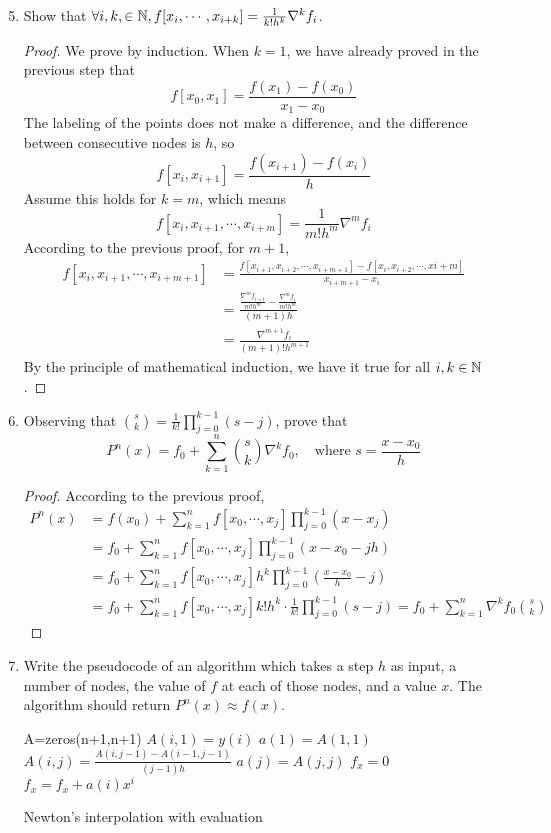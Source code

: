 \begin{enumerate}
	\setcounter{enumi}{4}
	\item Show that \(\forall i,k,\in\mathbb{N}, f[x_i,\cdots,x_{i+k}]=\frac{1}{k!h^k}\nabla^{k}f_i\).
	\begin{proof}
	We prove by induction.
	When $k=1$, we have already proved in the previous step that
	\[ f[x_0,x_{1}]=\frac{f(x_{1})-f(x_0)}{x_1-x_0} \]
	The labeling of the points does not make a difference, and the difference between consecutive nodes is $h$, so
	\[ f[x_i,x_{i+1}]=\frac{f(x_{i+1})-f(x_i)}{h} \]
	Assume this holds for \(k=m\), which means
	\[ f[x_i,x_{i+1},\cdots,x_{i+m}]=\frac{1}{m!h^m}\nabla^mf_i \]
	According to the previous proof, for $m+1$,
	\begin{align*}
	f[x_i,x_{i+1},\cdots,x_{i+m+1}]&=\frac{f[x_{i+1},x_{i+2},\cdots,x_{i+m+1}]-f[x_{i},x_{i+2},\cdots,x{i+m}]}{x_{i+m+1}-x_{i}}\\
	&=\frac{\frac{\nabla^mf_{i+1}}{m!h^m}-\frac{\nabla^mf_{i}}{m!h^m}}{(m+1)h}\\
	&=\frac{\nabla^{m+1}f_i}{(m+1)!h^{m+1}}
	\end{align*}
	By the principle of mathematical induction, we have it true for all \(i,k\in\mathbb{N}\).
	\end{proof}
	\item Observing that \(\binom{s}{k}=\frac{1}{k!}\prod_{j=0}^{k-1}(s-j)\), prove that 
	\[ P^n(x)=f_0 + \sum_{k=1}^{n}\binom{s}{k}\nabla^{k} f_0, \quad \textrm{where } s=\frac{x-x_0}{h} \]
	\begin{proof}
	According to the previous proof,
	\begin{align*}
	P^n(x)&=f(x_0)+\sum_{k=1}^{n} f[x_0,\cdots, x_j] \prod_{j=0}^{k-1}(x-x_j)\\
	&=f_0+\sum_{k=1}^{n} f[x_0,\cdots, x_j] \prod_{j=0}^{k-1}(x-x_0-jh)\\
	&=f_0+\sum_{k=1}^{n} f[x_0,\cdots, x_j] h^k \prod_{j=0}^{k-1}\left(\frac{x-x_0}{h}-j\right)\\
	&=f_0+\sum_{k=1}^{n} f[x_0,\cdots, x_j] k!h^k\cdot\frac{1}{k!} \prod_{j=0}^{k-1}\left(s-j\right)=f_0+\sum_{k=1}^{n} \nabla^kf_0 \binom{s}{k}
	\end{align*}
	\end{proof}
	\item Write the pseudocode of an algorithm which takes a step $h$ as input, a number of nodes, the value of $f$ at each of those nodes, and a value $x$.
	The algorithm should return \(P^{n}(x)\approx f(x)\).
	\begin{algorithm}[h]
		A=zeros(n+1,n+1)\;
		{
			\(A(i,1)=y(i)\)\;
		}
		\(a(1)=A(1,1)\)\;
		{
			{
				\(A(i,j)=\frac{A(i,j-1)-A(i-1,j-1)}{(j-1)h}\)\;
			}
			\(a(j)=A(j,j)\)\;
		}
		\(f_x=0\)\;
		{
			\( f_x=f_x+a(i)x^i \)
		}
		\caption{Newton's interpolation with evaluation}
	\end{algorithm}
\end{enumerate}